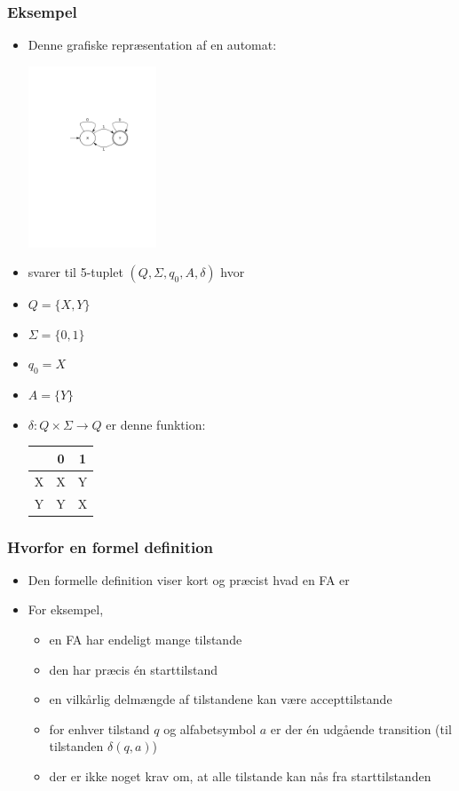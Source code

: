 \documentclass[]{beamer}
\begin{document}
\begin{frame}
  \frametitle{Eksempel}
  \begin{itemize}
  \item  Denne grafiske repræsentation af en automat:
\begin{center}
  \includegraphics[width=0.3\textwidth]{images/1_seminar_odd_num_ones}
\end{center}
  \item svarer til 5-tuplet $(Q, Σ, q_0, A, δ)$ hvor
 \item $Q = \{X,Y\}$
 \item $Σ = \{0,1\}$
 \item $q_0 = X$
 \item $A = \{Y\}$
 \item $δ: Q×Σ→Q$ er denne funktion:

\begin{center}
  \begin{tabular}{c|c c}
    & 0 & 1 \\
    \hline
    X& X& Y \\
    Y& Y & X \\
  \end{tabular}
\end{center}
  \end{itemize}
\end{frame}

\begin{frame}
  \frametitle{Hvorfor en formel definition}
  \begin{itemize}
  \item   Den formelle definition viser kort og præcist
hvad en FA er
\item For eksempel,
\begin{itemize}[<+->]
\item en FA har endeligt mange tilstande
\item den har præcis én starttilstand
\item en vilkårlig delmængde af tilstandene kan være
accepttilstande
\item for enhver tilstand $q$ og alfabetsymbol $a$ er der én
udgående transition (til tilstanden $δ(q,a)$)
\item der er ikke noget krav om, at alle tilstande kan nås
fra starttilstanden
\end{itemize}
  \end{itemize}
\end{frame}
\end{document}
